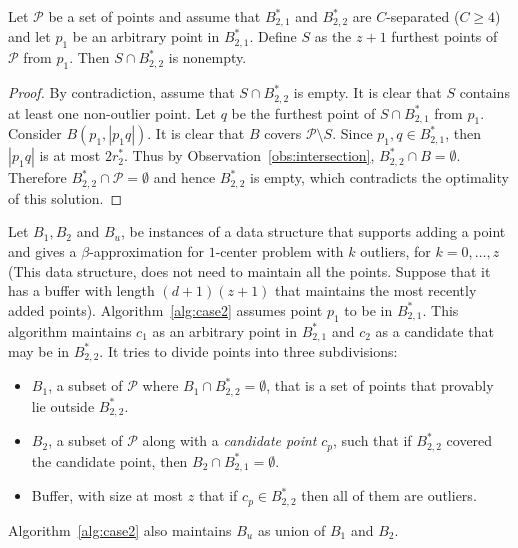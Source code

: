 \documentclass[envcountsame]{cls/cccg15}
\newcommand{\card}[1]{\left|{#1}\right|}
\newcommand{\gee}{\geqslant}
\renewcommand{\ge}{\gee}
\begin{document}
\begin{lemma}
\label{lem:c-sep}
Let $\mathcal{P}$ be a set of points and assume that $B_{2,1}^*$ and $B_{2,2}^*$ are $C$-separated ($C \ge 4$) and let $p_1$ be an arbitrary point in $B_{2,1}^*$. Define $S$ as the $z+1$ furthest points of $\mathcal{P}$ from $p_1$. Then $S \cap B_{2,2}^*$ is nonempty.
\end{lemma}
\begin{proof}
By contradiction, assume that $S \cap B_{2,2}^*$ is empty. It is clear that $S$ contains at least one non-outlier point. Let $q$ be the furthest point of $S \cap B_{2,1}^*$ from $p_1$. Consider $B(p_1, \card{p_1q})$. It is clear that $B$ covers $\mathcal{P} \setminus S$. Since $p_1, q \in B_{2,1}^*$, then $\card{p_1q}$ is at most $2r_2^*$. Thus by Observation~\ref{obs:intersection}, $B_{2,2}^* \cap B = \emptyset$. Therefore $B_{2,2}^* \cap \mathcal{P} = \emptyset$ and hence $B_{2,2}^*$ is empty, which contradicts the optimality of this solution.
\end{proof}

Let $B_1, B_2$ and $B_u$, be instances of a data structure that supports adding a point and gives a $\beta$-approximation for $1$-center problem with $k$ outliers, for $k=0,\dots,z$ (This data structure, does not need to maintain all the points. Suppose that it has a buffer with length $(d+1)(z+1)$ that maintains the most recently added points). Algorithm~\ref{alg:case2} assumes point $p_1$ to be in $B_{2,1}^*$. This algorithm maintains $c_1$ as an arbitrary point in $B_{2,1}^*$ and $c_2$ as a candidate that may be in $B_{2,2}^*$. It tries to divide points into three subdivisions:
\begin{itemize}
\item $B_1$, a subset of $\mathcal{P}$ where $B_1 \cap B_{2,2}^* = \emptyset$, that is a set of points that provably lie outside $B_{2, 2}^*$.
\item $B_2$, a subset of $\mathcal{P}$ along with a \emph{candidate point} $c_p$, such that if $B_{2, 2}^*$ covered the candidate point, then $B_2 \cap B_{2, 1}^* = \emptyset$.
\item Buffer, with size at most $z$ that if $c_p \in B_{2, 2}^*$ then all of them are outliers.
\end{itemize}
Algorithm~\ref{alg:case2} also maintains $B_u$ as union of $B_1$ and $B_2$.

\end{document}
